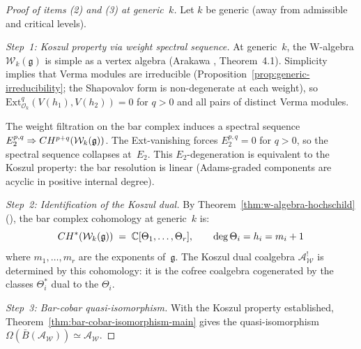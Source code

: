 \begin{proof}[Proof of items \textup{(2)} and \textup{(3)} at generic~$k$]
Let $k$ be generic (away from admissible and critical levels).

\emph{Step~1: Koszul property via weight spectral sequence.}
At generic~$k$, the W-algebra $\mathcal{W}_k(\mathfrak{g})$ is simple
as a vertex algebra (Arakawa \cite{Ara07}, Theorem~4.1).  Simplicity
implies that Verma modules are irreducible
(Proposition~\ref{prop:generic-irreducibility}; the Shapovalov form
is non-degenerate at each weight), so
$\mathrm{Ext}^q_{\mathcal{O}_k}(V(h_1), V(h_2)) = 0$ for $q > 0$
and all pairs of distinct Verma modules.

The weight filtration on the bar complex induces a spectral sequence
$E_2^{p,q} \Rightarrow CH^{p+q}(\mathcal{W}_k(\mathfrak{g}))$.
The Ext-vanishing forces $E_2^{p,q} = 0$ for $q > 0$, so the spectral
sequence collapses at~$E_2$.  This $E_2$-degeneration is equivalent to
the Koszul property: the bar resolution is linear
(Adams-graded components are acyclic in positive internal degree).

\emph{Step~2: Identification of the Koszul dual.}
By Theorem~\ref{thm:w-algebra-hochschild} (\ClaimStatusProvedHere),
the bar complex cohomology at generic~$k$ is:
\[
CH^*(\mathcal{W}_k(\mathfrak{g}))
\;=\; \mathbb{C}[\Theta_1, \ldots, \Theta_r],
\qquad \deg \Theta_i = h_i = m_i + 1
\]
where $m_1, \ldots, m_r$ are the exponents of~$\mathfrak{g}$.
The Koszul dual coalgebra $\mathcal{A}_{\mathcal{W}}^!$ is determined by
this cohomology: it is the cofree coalgebra cogenerated by the classes
$\Theta_i^*$ dual to the $\Theta_i$.

\emph{Step~3: Bar-cobar quasi-isomorphism.}
With the Koszul property established,
Theorem~\ref{thm:bar-cobar-isomorphism-main} gives the
quasi-isomorphism
$\Omega(\bar{B}(\mathcal{A}_{\mathcal{W}})) \simeq
\mathcal{A}_{\mathcal{W}}$.
\end{proof}



